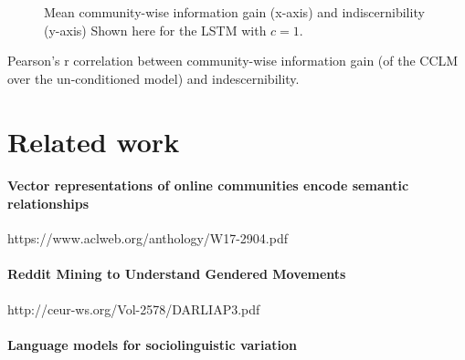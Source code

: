 \documentclass[11pt,a4paper]{article}
\begin{document}
\begin{figure}
  \caption{%
    Mean community-wise information gain (x-axis) 
    and indiscernibility (y-axis) 
    Shown here for the LSTM with $c = 1$.}
  \label{fig:cclm_lmcc_ppl}
\end{figure}

\begin{table}
  \centering
  \caption{
    Pearson's r correlation between community-wise information gain (of the CCLM over the un-conditioned model) and indescernibility.
  }
  \label{tab:lmcc_gain}
\end{table}





\section{Related work}

\paragraph{Vector representations of online communities encode semantic relationships}
https://www.aclweb.org/anthology/W17-2904.pdf

\paragraph{Reddit Mining to Understand Gendered Movements}
http://ceur-ws.org/Vol-2578/DARLIAP3.pdf

\paragraph{Language models for sociolinguistic variation}
\cite{DelTredici2017}
\end{document}
